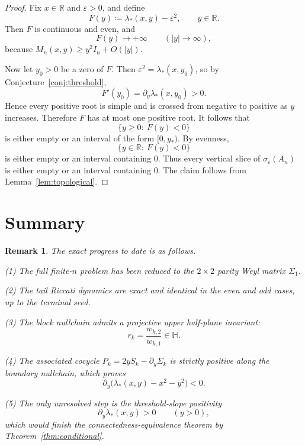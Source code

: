 \documentclass[11pt]{article}
\newtheorem{remark}[theorem]{Remark}
\newcommand{\R}{\mathbb R}
\newcommand{\eps}{\varepsilon}
\begin{document}
\begin{proof}
Fix \(x\in\R\) and \(\eps>0\), and define
\[
F(y)\coloneqq \lambda_*(x,y)-\eps^2,
\qquad y\in\R.
\]
Then \(F\) is continuous and even, and
\[
F(y)\to +\infty
\qquad (|y|\to\infty),
\]
because \(M_n(x,y)\ge y^2I_n+O(|y|)\).

Now let \(y_0>0\) be a zero of \(F\). Then \(\eps^2=\lambda_*(x,y_0)\), so by
Conjecture~\ref{conj:threshold},
\[
F'(y_0)=\partial_y\lambda_*(x,y_0)>0.
\]
Hence every positive root is simple and is crossed from negative to positive as \(y\)
increases. Therefore \(F\) has at most one positive root. It follows that
\[
\{y\ge 0:\ F(y)<0\}
\]
is either empty or an interval of the form \([0,y_*)\). By evenness,
\[
\{y\in\R:\ F(y)<0\}
\]
is either empty or an interval containing \(0\). Thus every vertical slice of
\(\sigma_\eps(A_n)\) is either empty or an interval containing \(0\). The claim follows
from Lemma~\ref{lem:topological}.
\end{proof}

\section{Summary}

\begin{remark}
The exact progress to date is as follows.

\smallskip
\noindent
\textup{(1)} The full finite-\(n\) problem has been reduced to the \(2\times2\) parity Weyl
matrix \(\Sigma_1\).

\smallskip
\noindent
\textup{(2)} The tail Riccati dynamics are exact and identical in the even and odd cases,
up to the terminal seed.

\smallskip
\noindent
\textup{(3)} The block nullchain admits a projective upper half-plane invariant:
\[
r_k=\frac{w_{k,2}}{w_{k,1}}\in\mathbb H.
\]

\smallskip
\noindent
\textup{(4)} The associated cocycle \(P_k=2yS_k-\partial_y\Sigma_k\) is strictly positive
along the boundary nullchain, which proves
\[
\partial_y\bigl(\lambda_*(x,y)-x^2-y^2\bigr)<0.
\]

\smallskip
\noindent
\textup{(5)} The only unresolved step is the threshold-slope positivity
\[
\partial_y\lambda_*(x,y)>0
\qquad (y>0),
\]
which would finish the connectedness-equivalence theorem by
Theorem~\ref{thm:conditional}.
\end{remark}
\end{document}
